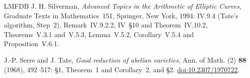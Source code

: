 \documentclass[11pt]{article}
\begin{document}
\begin{thebibliography}{LMFDB}
J. H. Silverman, \emph{Advanced Topics in the Arithmetic of Elliptic Curves}, Graduate Texts in Mathematics~151,
Springer, New York, 1994: IV.9.4 (Tate's algorithm, Step~2), Remark~IV.9.2.2, IV~\S10 and Theorem~IV.10.2,
Theorems~V.3.1 and~V.5.3, Lemma~V.5.2, Corollary~V.5.4 and Proposition~V.6.1.

J.-P. Serre and J. Tate, \emph{Good reduction of abelian varieties}, Ann. of Math. (2) \textbf{88} (1968),
492--517: \S1, Theorem~1 and Corollary~2, and \S2. \href{https://doi.org/10.2307/1970722}{doi:10.2307/1970722}.

\end{thebibliography}
\end{document}
